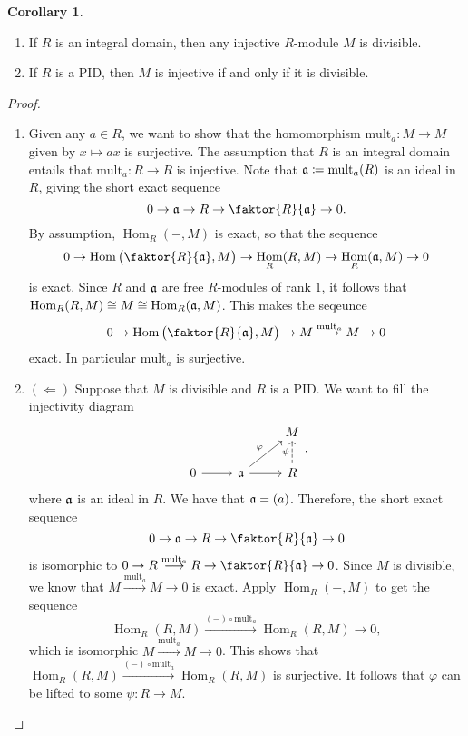 \documentclass[10pt,letterpaper,cm]{nupset}
\theoremstyle{definition}
\newtheorem{corollary}{Corollary}
\newcommand{\1}{\mathbf{1}}
\newcommand{\0}{\vec 0}
\DeclareMathOperator{\Hom}{Hom}
\begin{document}
\begin{corollary} $ $
\begin{enumerate}
\item If $R$ is an integral domain, then any injective $R$-module $M$ is divisible.
\item If $R$ is a PID, then $M$ is injective if and only if it is divisible.
\end{enumerate}
\end{corollary}
\begin{proof} $ $
\begin{enumerate}
\item Given any $a\in R$, we want to show that the homomorphism $\text{mult}_a : M \to M$ given by $x\mapsto ax$ is surjective. The assumption that $R$ is an integral domain entails that $\text{mult}_a : R\to R$ is injective. Note that $\frak{a}\coloneqq  \text{mult}_a(R)$ is an ideal in $R$, giving the short exact sequence $$0 \to \frak{a} \to R \to \faktor{R}{\frak{a}}\to 0.  $$ By assumption, $\Hom_R(-, M)$ is exact, so that the sequence $$0 \to \Hom\big (\faktor{R}{\frak{a}}, M \big ) \to \Hom_R(R, M) \to \Hom_R(\frak{a}, M) \to 0   $$ is exact. Since $R$ and $\frak{a}$ are free $R$-modules of rank $1$, it follows that $\Hom_R(R, M) \cong M \cong  \Hom_R(\frak{a}, M)$. This makes the seqeunce  $$0 \to \Hom\big (\faktor{R}{\frak{a}}, M \big ) \to M \overset{\text{mult}_a}{\longrightarrow} M \to 0 $$ exact. In particular $\text{mult}_a$ is surjective.

\item $(\Longleftarrow)$ Suppose that $M$ is divisible and $R$ is a PID. We want to fill the injectivity diagram
\[
\begin{tikzcd}
 &  & M \\
0 \arrow[r] & \frak{a} \arrow[r] \arrow[ru, "\varphi"] & R \arrow[u, "\psi", dashed]
\end{tikzcd}.
\]
where $\frak{a}$ is an ideal in $R$. We have that $\frak{a} = (a)$. Therefore, the short exact sequence $$0 \to \frak{a} \to R \to \faktor{R}{\frak{a}} \to 0$$ is isomorphic to $0 \to R \overset{\text{mult}_a}{\longrightarrow} R \to \faktor{R}{\frak{a}}\to 0$. Since $M$ is divisible, we know that $M \overset{\text{mult}_a}{\longrightarrow} M \to 0$ is exact.  Apply $\Hom_R(-, M)$ to get the sequence $$\Hom_R(R, M) \overset{(-)\circ \text{mult}_a}{\longrightarrow} \Hom_R(R, M) \to 0,$$ which is isomorphic $M \overset{\text{mult}_a}{\longrightarrow} M \to 0$. This shows that $\Hom_R(R, M) \overset{(-)\circ \text{mult}_a}{\longrightarrow} \Hom_R(R, M)$ is surjective. It follows that $\varphi$ can be lifted to some $\psi : R \to M$.
\end{enumerate}
\end{proof}
\end{document}
